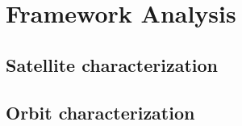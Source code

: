 \section{Framework Analysis}
\label{sec:framework}

\subsection{Satellite characterization }
\label{subsec:sat_characterization}

\subsection{Orbit characterization}
\label{subsec:orbit_characterization}

